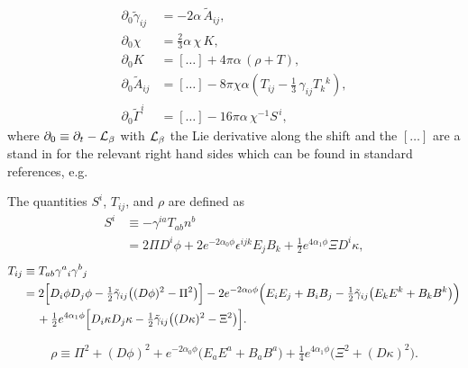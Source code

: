 \begin{align}
\partial_0\tilde{\gamma}_{ij} &= -2\alpha\,\tilde{A}_{ij},\\[4pt]
\partial_0 \chi &= \tfrac{2}{3}\alpha\,\chi\,K,\\[4pt]
\partial_0 K &= [\ldots] + 4\pi\alpha\,(\rho + T),\\[4pt]
\partial_0\tilde{A}_{ij} &= [\ldots] - 8\pi\chi\alpha\left( T_{ij} - \tfrac{1}{3}\,\gamma_{ij} T_k{}^k\right),\\[4pt]
\partial_0 \tilde{\Gamma}^i &= [\ldots] - 16\pi\alpha\,\chi^{-1} S^{\,i},
\end{align}
where $\partial_0 \equiv \partial_t - {\cal L}_{\beta}$ with ${\cal L}_{\beta}$ the Lie derivative along the shift and the $[\ldots]$ are a stand in for the relevant right hand sides which can be found in standard references, e.g.~\cite{Baumgarte2010} 

The quantities $S^i$, $T_{ij}$, and $\rho$ are defined as
\begin{equation}
\begin{aligned}
S^i
&\equiv -\gamma^{ia} T_{ab} n^b  \\
&=   2\Pi D^i\phi
   + 2e^{-2\alpha_0\phi}\epsilon^{ijk}E_jB_k  %
   + \tfrac{1}{2}e^{4\alpha_1\phi}\Xi D^i\kappa ,
\label{eq:Si}
\end{aligned}
\end{equation}
\begin{equation}
\begin{aligned}
T_{ij}
&\equiv T_{ab} \gamma^a{}_i \gamma^b{}_j  \\
&= 2\Bigl[
      D_i\phi D_j\phi
      - \tfrac{1}{2}\tilde{\gamma}_{ij}\bigl((D\phi)^2-\Pi^2\bigr)
   \Bigr] 
- 2e^{-2\alpha_0\phi}\Bigl( 
       E_iE_j + B_iB_j 
      - \tfrac{1}{2}\tilde{\gamma}_{ij}
        \bigl(E_kE^k + B_kB^k\bigr)
   \Bigr)  \\
&\quad\,
+ \tfrac{1}{2}e^{4\alpha_1\phi}\Bigl[
      D_i\kappa D_j\kappa
      - \tfrac{1}{2}\tilde{\gamma}_{ij}\bigl((D\kappa)^2-\Xi^2\bigr)
   \Bigr] .
\label{eq:Tij}
\end{aligned}
\end{equation}

\begin{equation}
    \rho \equiv \Pi^2 + (D\phi)^2 
    + e^{-2 \alpha_0 \phi}\big( E_a  E^a +  B_a  B^a\big) + \tfrac{1}{4} e^{4 \alpha_1 \phi}\big(\Xi^2 + (D\kappa)^2\big).
\end{equation}

